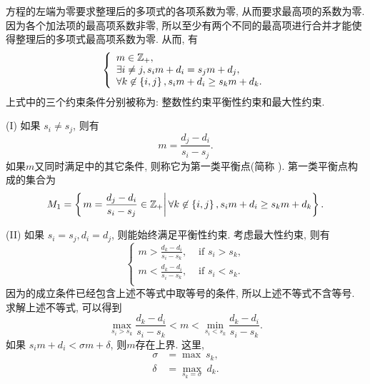 方程的左端为零要求整理后的多项式的各项系数为零, 从而要求最高项的系数为零. 因为各个加法项的最高项系数非零, 所以至少有两个不同的最高项进行合并才能使得整理后的多项式最高项系数为零. 从而, 有 
\begin{equation}
\left\{
\begin{array}{l}
m\in \mathbb Z_+  ,                                     \\
\exists i\neq j, s_i m+d_i=s_j m+d_j    ,               \\
\forall k \not\in \left\{i,j\right\}, s_i m+d_i\ge s_k m+d_k .
\end{array}
\right.
\label{cond}
\end{equation}
上式中的三个约束条件分别被称为: 整数性约束\D 平衡性约束和最大性约束. 

(I) 如果 $s_i \neq s_j$, 则有 
\begin{equation}
m=\frac{d_j-d_i}{s_i-s_j}.
\end{equation}
如果$m$又同时满足中的其它条件, 则称它为第一类平衡点(简称 \BPone{}). 第一类平衡点构成的集合为 
\begin{equation}
M_1=\left\{\left. m=\frac{d_j-d_i}{s_i-s_j}\in \mathbb Z_+\right\vert \forall k\not\in \left\{i,j\right\}, s_i m+d_i\ge s_k m+d_k\right\}.
\end{equation}

(II) 如果 $s_i = s_j, d_i=d_j$, 则能始终满足平衡性约束. 考虑最大性约束, 则有 
\begin{equation}
\left\{
\begin{aligned}
m > \frac{d_k-d_i}{s_i-s_k}, & \text{ if } s_i>s_k,  \\
m < \frac{d_k-d_i}{s_i-s_k}, & \text{ if } s_i<s_k.  \\
\end{aligned}
\right.
\end{equation}
因为\BPone{}的成立条件已经包含上述不等式中取等号的条件, 所以上述不等式不含等号. 求解上述不等式, 可以得到 
\begin{equation}
\underset{s_i>s_k}{\max}{\frac{d_k-d_i}{s_i-s_k}} < m < \underset{s_i<s_k}{\min}{\frac{d_k-d_i}{s_i-s_k}}.
\end{equation}
如果 $s_i m + d_i < \sigma m + \delta$, 则$m$存在上界. 这里, 
\begin{equation}
\begin{aligned}
\sigma &= \max ~s_k,  \\
\delta &= \underset{s_k=\sigma}{\max}{~d_k}.
\end{aligned}
\label{eq-max-sd}
\end{equation}

